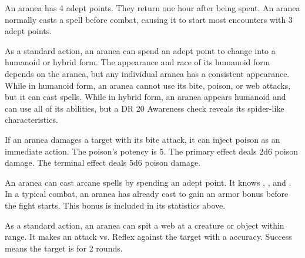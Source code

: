      An aranea has 4 adept points.
    They return one hour after being spent.
    An aranea normally casts a spell before combat, causing it to start most encounters with 3 adept points.

     As a standard action, an aranea can spend an adept point to change into a humanoid or hybrid form.
    The appearance and race of its humanoid form depends on the aranea, but any individual aranea has a consistent appearance.
    While in humanoid form, an aranea cannot use its bite, poison, or web attacks, but it can cast spells.
    While in hybrid form, an aranea appears humanoid and can use all of its abilities, but a DR 20 Awareness check reveals its spider-like characteristics.

     If an aranea damages a target with its bite attack, it can inject poison as an immediate action.
    The poison's potency is 5.
    The primary effect deals 2d6 poison damage.
    The terminal effect deals 5d6 poison damage.

     An aranea can cast arcane spells by spending an adept point.
    It knows , , and .
    In a typical combat, an aranea has already cast  to gain an armor bonus before the fight starts.
    This bonus is included in its statistics above.

     As a standard action, an aranea can spit a web at a creature or object within \rngmed range.
    It makes an attack vs. Reflex against the target with a  accuracy.
    Success means the target is \immobilized for 2 rounds.
